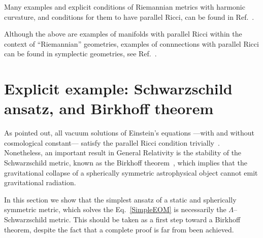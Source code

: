 Many examples and explicit conditions of Riemannian metrics with harmonic curvature, and conditions for them to have parallel Ricci, can be found in Ref.~\cite{derdzinski1988riemannian}.

Although the above are examples of manifolds with parallel Ricci within the context of ``Riemannian'' geometries, examples of connnections with parallel Ricci can be found in symplectic geometries, see Ref.~\cite{cahen2000symplectic}. 


\section{\label{Schw}Explicit example: Schwarzschild ansatz, and Birkhoff theorem}



As pointed out, all vacuum solutions of Einstein's equations ---with and without cosmological constant--- satisfy the parallel Ricci condition trivially~\cite{bourguignon1981varietes}. Nonetheless, an important result in General Relativity is the stability of the Schwarzschild metric, known as the Birkhoff theorem~\cite{Jebsen1921,Birkhoff1923,Alexandrow1923,Eisland1925}, which implies that the gravitational collapse of a spherically symmetric astrophysical object cannot emit gravitational radiation. 

In this section we show that the simplest ansatz of a static and spherically symmetric metric, which solves the Eq.~\eqref{SimpleEOM} is necessarily the $\Lambda$--Schwarzschild metric. This should be taken as a first step toward a Birkhoff theorem, despite the fact that a complete proof is far from been achieved.

